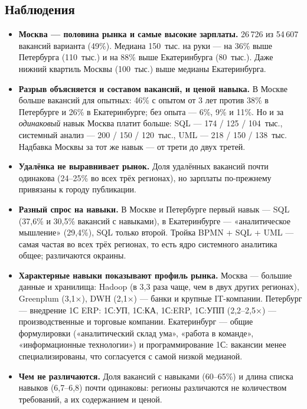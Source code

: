 \subsection{Наблюдения}

\begin{itemize}
\item \textbf{Москва --- половина рынка и самые высокие зарплаты.} 26\,726 из 54\,607 вакансий варианта (49\%). Медиана 150~тыс. на руки --- на 36\% выше Петербурга (110~тыс.) и на 88\% выше Екатеринбурга (80~тыс.). Даже нижний квартиль Москвы (100~тыс.) выше медианы Екатеринбурга.
\item \textbf{Разрыв объясняется и составом вакансий, и ценой навыка.} В Москве больше вакансий для опытных: 46\% с опытом от 3 лет против 38\% в Петербурге и 26\% в Екатеринбурге; без опыта --- 6\%, 9\% и 11\%. Но и за \emph{одинаковый} навык Москва платит больше: SQL --- 174 / 125 / 104~тыс., системный анализ --- 200 / 150 / 120~тыс., UML --- 218 / 150 / 138~тыс. Надбавка Москвы за тот же навык --- от трети до двух третей.
\item \textbf{Удалёнка не выравнивает рынок.} Доля удалённых вакансий почти одинакова (24--25\% во всех трёх регионах), но зарплаты по-прежнему привязаны к городу публикации.
\item \textbf{Разный спрос на навыки.} В Москве и Петербурге первый навык --- SQL (37,6\% и 30,5\% вакансий с навыками), в Екатеринбурге --- «аналитическое мышление» (29,4\%), SQL только второй. Тройка BPMN + SQL + UML --- самая частая во всех трёх регионах, то есть ядро системного аналитика общее; различаются окраины.
\item \textbf{Характерные навыки показывают профиль рынка.} Москва --- большие данные и хранилища: Hadoop (в 3,3 раза чаще, чем в двух других регионах), Greenplum (3,1×), DWH (2,1×) --- банки и крупные IT-компании. Петербург --- внедрение 1С ERP: 1С:УП, 1С:КА, 1С:ERP, 1С:УПП (2,2--2,5×) --- производственные и торговые компании. Екатеринбург --- общие формулировки («аналитический склад ума», «работа в команде», «информационные технологии») и программирование 1С: вакансии менее специализированы, что согласуется с самой низкой медианой.
\item \textbf{Чем не различаются.} Доля вакансий с навыками (60--65\%) и длина списка навыков (6,7--6,8) почти одинаковы: регионы различаются не количеством требований, а их содержанием и ценой.
\end{itemize}

